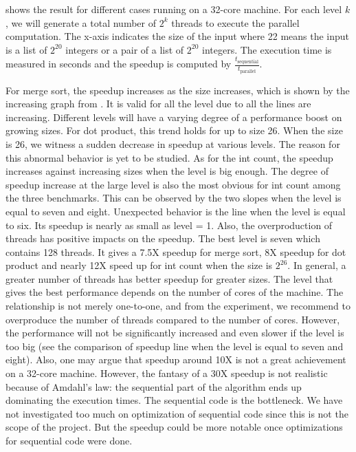  shows the result for different cases running on a 32-core machine. For each level $k$, we will generate a total number of $2^k$ threads to execute the parallel computation. The x-axis indicates the size of the input where 22 means the input is a list of $2^20$ integers or a pair of a list of $2^20$ integers. The execution time is measured in seconds and the speedup is computed by $\frac{t_{\text{sequential}}}{t_\text{parallel}}$. 

For merge sort, the speedup increases as the size increases, which is shown by the increasing graph from . It is valid for all the level due to all the lines are increasing. Different levels will have a varying degree of a performance boost on growing sizes. For dot product, this trend holds for up to size 26. When the size is 26, we witness a sudden decrease in speedup at various levels. The reason for this abnormal behavior is yet to be studied. As for the int count, the speedup increases against increasing sizes when the level is big enough. The degree of speedup increase at the large level is also the most obvious for int count among the three benchmarks. This can be observed by the two slopes when the level is equal to seven and eight. Unexpected behavior is the line when the level is equal to six. Its speedup is nearly as small as level = 1. Also, the overproduction of threads has positive impacts on the speedup. The best level is seven which contains 128 threads. It gives a 7.5X speedup for merge sort, 8X speedup for dot product and nearly 12X speed up for int count when the size is $2^{26}$. In general, a greater number of threads has better speedup for greater sizes. The level that gives the best performance depends on the number of cores of the machine. The relationship is not merely one-to-one, and from the experiment, we recommend to overproduce the number of threads compared to the number of cores. However, the performance will not be significantly increased and even slower if the level is too big (see the comparison of speedup line when the level is equal to seven and eight). Also, one may argue that speedup around 10X is not a great achievement on a 32-core machine. However, the fantasy of a 30X speedup is not realistic because of Amdahl's law: the sequential part of the algorithm ends
up dominating the execution times. The sequential code is the bottleneck. We have not investigated too much on optimization of sequential code since this is not the scope of the project. But the speedup could be more notable once optimizations for sequential code were done.
